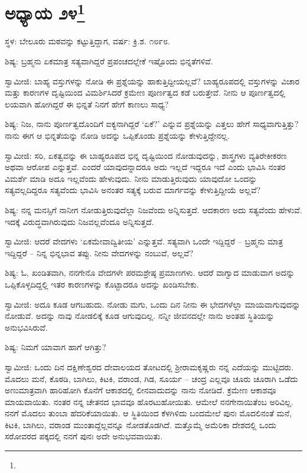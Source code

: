 \chapter[ಅಧ್ಯಾಯ ೨೪]{ಅಧ್ಯಾಯ ೨೪\protect\footnote{}}

\centerline{ಸ್ಥಳ: ಬೇಲೂರು ಮಠವನ್ನು ಕಟ್ಟುತ್ತಿದ್ದಾಗ, ವರ್ಷ: ಕ್ರಿ.ಶ. ೧೮೯೮.}

ಶಿಷ್ಯ: ಬ್ರಹ್ಮನು ಏಕಮಾತ್ರ ಸತ್ಯವಾಗಿದ್ದರೆ ಪ್ರಪಂಚದಲ್ಲೇಕೆ ಇಷ್ಟೊಂದು ಭಿನ್ನತೆಗಳಿವೆ.

ಸ್ವಾಮೀಜಿ: ಬಾಹ್ಯ ವಸ್ತುಗಳನ್ನು ನೋಡಿ ಈ ಪ್ರಶ್ನೆಯನ್ನು ಹಾಕುತ್ತಿದ್ದೀಯಲ್ಲವೆ? ಬಾಹ್ಯರೂಪದಲ್ಲಿ ವಸ್ತುಗಳನ್ನು ವಿಚಾರ ಮತ್ತು ಕಾರಣಗಳ ದೃಷ್ಟಿಯಿಂದ ವಿಮರ್ಶಿಸಿದರೆ ಕ್ರಮೇಣ ಪೂರ್ಣತ್ವದ ಕಡೆ ಬರುತ್ತೇವೆ. ನೀನು ಆ ಪೂರ್ಣತ್ವದಲ್ಲಿ ಲಯವಾಗಿ ಹೋಗಿದ್ದರೆ ಈ ಭಿನ್ನತೆ ನಿನಗೆ ಹೇಗೆ ಕಾಣಲು ಸಾಧ್ಯ?

ಶಿಷ್ಯ: ನಿಜ, ನಾನು ಪೂರ್ಣತ್ವದೊಂದಿಗೆ ಐಕ್ಯನಾಗಿದ್ದರೆ ‘ಏಕೆ?’ ಎನ್ನುವ ಪ್ರಶ್ನೆಯನ್ನು ಎತ್ತಲು ಹೇಗೆ ಸಾಧ್ಯವಾಗುತ್ತಿತ್ತು? ನಾನು ಈಗ ಆ ಭಿನ್ನತೆಯನ್ನು ನೋಡಿ ಅದನ್ನು ಒಪ್ಪಿಕೊಂಡು ಪ್ರಶ್ನೆಯನ್ನು ಕೇಳುತ್ತಿದ್ದೇನಲ್ಲ.

ಸ್ವಾಮೀಜಿ: ಸರಿ, ಏಕತ್ವವನ್ನು ಈ ಬಾಹ್ಯರೂಪದ ಭಿನ್ನ ದೃಷ್ಟಿಯಿಂದ ನೋಡುವುದನ್ನು, ಶಾಸ್ತ್ರಗಳು ವ್ಯತಿರೇಕೀಕರಣ ಅಥವಾ ಆರೋಪ ಎನ್ನುತ್ತವೆ. ಎಂದರೆ ಯಾವುದನ್ನಾದರೂ ಅದು ಇಲ್ಲದೆ ಇದ್ದರೂ ಇದೆ ಎಂದು ಭಾವಿಸಿ ನಂತರ ವಿಮರ್ಶೆ ಮಾಡಿ ಅದೂ ಇಲ್ಲವೆಂದು ಹೇಳುವುದು. ನೀನು ಮಾಡುತ್ತಿರುವುದು ಯಾವುದೋ ಒಂದನ್ನು ಸತ್ಯವಲ್ಲದಿದ್ದರೂ ಸತ್ಯವೆಂದು ಭಾವಿಸಿ ಅನಂತರ ಸತ್ಯಕ್ಕೆ ಬರುವ ಮಾರ್ಗವನ್ನು ಕೇಳುತ್ತಿದ್ದೀಯೆ ಅಲ್ಲವೆ?

ಶಿಷ್ಯ: ನನ್ನ ಮನಸ್ಸಿಗೆ ನಾನೀಗ ನೋಡುತ್ತಿರುವುದೆಲ್ಲಾ ನಿಜವೆಂದು ಅನ್ನಿಸುತ್ತದೆ. ಆದಕಾರಣ ಅದು ಸತ್ಯವೆಂದು ಹೇಳುವೆ. ಇದಕ್ಕೆ ವಿರುದ್ಧವಾಗಿರುವುದು ನಿಜವಲ್ಲವೆಂದೂ ಅನ್ನಿಸುತ್ತದೆ.

ಸ್ವಾಮೀಜಿ: ಆದರೆ ವೇದಗಳು ‘ಏಕಮೇವಾದ್ವಿತೀಯ’ ಎನ್ನುತ್ತವೆ. ಸತ್ಯವಾಗಿ ಒಂದೇ ಇದ್ದಿದ್ದರೆ – ಬ್ರಹ್ಮನು ಮಾತ್ರ ಇದ್ದಿದ್ದರೆ – ನಿನ್ನ ಭಿನ್ನಭಾವ ತಪ್ಪು. ನೀನು ವೇದಗಳನ್ನು ನಂಬುವೆ, ಅಲ್ಲವೆ?

ಶಿಷ್ಯ: ಓ, ಖಂಡಿತವಾಗಿ, ನನಗೇನೊ ವೇದಗಳೇ ಪರಮಶ್ರೇಷ್ಠ ಪ್ರಮಾಣಗಳು. ಆದರೆ ವಾಗ್ವಾದ ಮಾಡುವಾಗ ಅದನ್ನು ಒಪ್ಪಿಕೊಳ್ಳದಿದ್ದಲ್ಲಿ ಇತರ ಕಾರಣಗಳನ್ನು ಕೊಟ್ಟಾದರೂ ಅದನ್ನು ಖಂಡಿಸಬೇಕು.

ಸ್ವಾಮೀಜಿ: ಅದೂ ಕೂಡ ಆಗಬಹುದು. ನೋಡು ಮಗು, ಒಂದು ದಿನ ನೀನು ಈ ಭೇದಗಳೆಲ್ಲಾ ಮಾಯವಾಗುವುದನ್ನು ನೋಡುವೆ. ಅದನ್ನು ನಾವು ನೋಡಲಿಕ್ಕೆ ಕೂಡ ಆಗುವುದಿಲ್ಲ. ನನ್ನೀ ಜೀವನದಲ್ಲೇ ನಾನು ಅಂತಹ ಸ್ಥಿತಿಯನ್ನು ಅನುಭವಿಸಿರುವೆ.

ಶಿಷ್ಯ: ನಿಮಗೆ ಯಾವಾಗ ಹಾಗೆ ಆಗಿತ್ತು?

ಸ್ವಾಮೀಜಿ: ಒಂದು ದಿನ ದಕ್ಷಿಣೇಶ್ವರದ ದೇವಾಲಯದ ತೋಟದಲ್ಲಿ ಶ‍್ರೀರಾಮಕೃಷ್ಣರು ನನ್ನ ಎದೆಯನ್ನು ಮುಟ್ಟಿದರು. ಮೊದಲು ಮನೆ, ಕೊಠಡಿ, ಬಾಗಿಲು, ಕಿಟಕಿ, ವರಾಂಡ, ಗಿಡ, ಸೂರ್ಯ – ಚಂದ್ರ ಎಲ್ಲವೂ ಚೂರು ಚೂರಾಗಿ ಒಡೆದು ಅಣುಮಾತ್ರವಾಗಿ ಹಾರಿಹೋಗಿ ಕೊನೆಗೆ ಆಕಾಶದಲ್ಲಿ ಲೀನವಾದುದನ್ನು ನಾನು ನೋಡಿದೆ. ಕ್ರಮೇಣ ಆಕಾಶವೂ ಮಾಯವಾಯಿತು. ನಂತರ ನನ್ನ ಚೇತನದ ಭಾವವೂ ಹೊರಟುಹೋಯಿತು. ಆಮೇಲೆ ನನಗೇನಾಯಿತೆಂಬ ಅರಿವಿಲ್ಲ. ನನಗೆ ಮೊದಲು ತುಂಬಾ ಹೆದರಿಕೆಯಾಯಿತು. ಆ ಸ್ಥಿತಿಯಿಂದ ಕೆಳಗಿಳಿದು ಬಂದಮೇಲೆ ಪುನಃ ಮೊದಲಿನಂತೆ ಮನೆ, ಕಿಟಕಿ, ಬಾಗಿಲು, ವರಾಂಡ ಮುಂತಾದ್ದೆಲ್ಲವನ್ನೂ ನೋಡತೊಡಗಿದೆ. ಮತ್ತೊಮ್ಮೆ ಅಮೆರಿಕಾ ದೇಶದಲ್ಲಿ ಒಂದು ಸರೋವರದ ಪಕ್ಕದಲ್ಲಿ ನನಗೆ ಪುನಃ ಅದೇ ಅನುಭವವಾಯಿತು.

